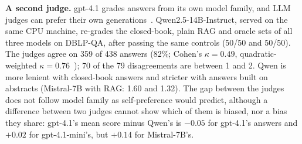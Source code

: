 \documentclass[conference]{IEEEtran}
\newcommand{\dq}{DBLP-QA}
\begin{document}
\textbf{A second judge.} gpt-4.1 grades answers from its own model family, and LLM judges can prefer their
own generations~\cite{panickssery2024selfpref}. Qwen2.5-14B-Instruct, served on the same CPU machine,
re-grades the closed-book, plain RAG and oracle sets of all three models on \dq{}, after passing the same
controls (50/50 and 50/50). The judges agree on 359 of 438 answers (82\%; Cohen's $\kappa=0.49$,
quadratic-weighted $\kappa=0.76$~\cite{cohen1968weighted}); 70 of the 79 disagreements are between 1 and
2. Qwen is more lenient with closed-book answers and stricter with answers built on abstracts (Mistral-7B
with RAG: 1.60 and 1.32). The gap between the judges does not follow model family as self-preference
would predict, although a difference between two judges cannot show which of them is biased, nor a bias
they share: gpt-4.1's mean score minus Qwen's is $-0.05$ for gpt-4.1's answers and $+0.02$ for
gpt-4.1-mini's, but $+0.14$ for Mistral-7B's.
\end{document}
